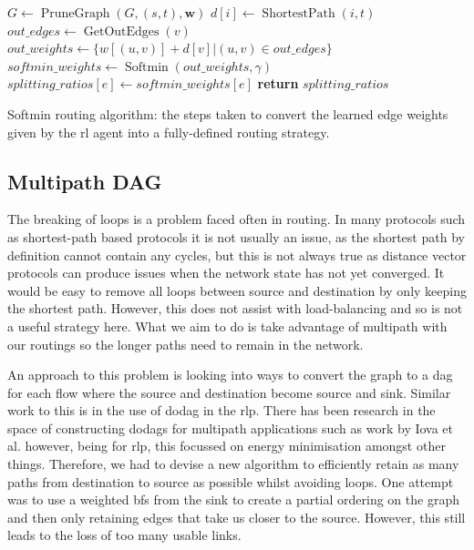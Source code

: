 \begin{algorithm}[t]
\small
\begin{algorithmic}
    \State $G \gets \operatorname{PruneGraph}(G, (s, t), \bm{w})$
      \State $d[i] \gets \operatorname{ShortestPath}(i, t)$
    \EndFor
      \State $out\_edges \gets \operatorname{GetOutEdges}(v)$
      \State $out\_weights \gets \{w[(u, v)] + d[v] | (u, v) \in out\_edges\}$
      \State{}
      \State $softmin\_weights \gets \operatorname{Softmin}(out\_weights, \gamma)$
        \State $splitting\_ratios[e] \gets softmin\_weights[e]$
      \EndFor
    \EndFor
  \EndFor
  \State \textbf{return} $splitting\_ratios$
\EndFunction
\end{algorithmic}
\caption{Softmin routing algorithm: the steps taken to convert the learned edge weights given by the \ac{rl} agent into a fully-defined routing strategy.}
\label{algorithm:softmin}
\end{algorithm}

\subsection{Multipath DAG}
The breaking of loops is a problem faced often in routing. In many protocols such as shortest-path based protocols it is not usually an issue, as the shortest path by definition cannot contain any cycles, but this is not always true as distance vector protocols can produce issues when the network state has not yet converged. It would be easy to remove all loops between source and destination by only keeping the shortest path. However, this does not assist with load-balancing and so is not a useful strategy here. What we aim to do is take advantage of multipath with our routings so the longer paths need to remain in the network.

An approach to this problem is looking into ways to convert the graph to a \ac{dag} for each flow where the source and destination become source and sink. Similar work to this is in the use of \ac{dodag} in the \ac{rlp}\cite{rfc6550}. There has been research in the space of constructing \acp{dodag} for multipath applications such as work by Iova et al.\cite{iova2015using} however, being for \ac{rlp}, this focussed on energy minimisation amongst other things.
Therefore, we had to devise a new algorithm to efficiently retain as many paths from destination to source as possible whilst avoiding loops. One attempt was to use a weighted \ac{bfs} from the sink to create a partial ordering on the graph and then only retaining edges that take us closer to the source. However, this still leads to the loss of too many usable links.

